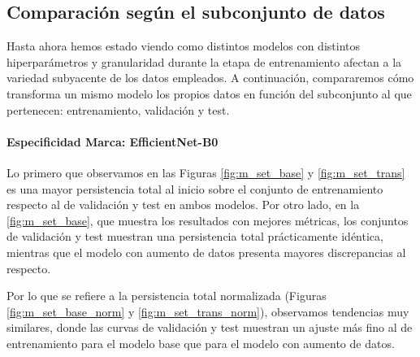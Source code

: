\subsection{Comparación según el subconjunto de datos}
\label{subsec:set}

Hasta ahora hemos estado viendo como distintos modelos con distintos hiperparámetros y granularidad durante la etapa de entrenamiento afectan a la variedad subyacente de los datos empleados. A continuación, compararemos cómo transforma un mismo modelo los propios datos en función del subconjunto al que pertenecen: entrenamiento, validación y test.

\paragraph{Especificidad Marca: EfficientNet-B0}

Lo primero que observamos en las Figuras \ref{fig:m_set_base} y \ref{fig:m_set_trans} es una mayor persistencia total al inicio sobre el conjunto de entrenamiento respecto al de validación y test en ambos modelos. Por otro lado, en la \autoref{fig:m_set_base}, que muestra los resultados con mejores métricas, los conjuntos de validación y test muestran una persistencia total prácticamente idéntica, mientras que el modelo con aumento de datos presenta mayores discrepancias al respecto.

Por lo que se refiere a la persistencia total normalizada (Figuras \ref{fig:m_set_base_norm} y \ref{fig:m_set_trans_norm}), observamos tendencias muy similares, donde las curvas de validación y test muestran un ajuste más fino al de entrenamiento para el modelo base que para el modelo con aumento de datos. 

